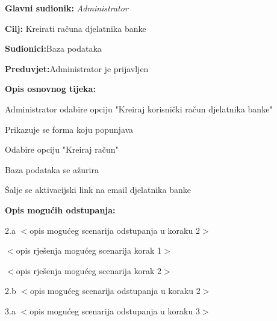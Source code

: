 \documentclass[11pt]{book}
\begin{document}
\noindent {}
\begin{packed_item}
	
	\item \textbf{Glavni sudionik: }\textit{Administrator}
	\item  \textbf{Cilj:} {Kreirati računa djelatnika banke}
	\item  \textbf{Sudionici:}{Baza podataka}
	\item  \textbf{Preduvjet:}{Administrator je prijavljen}
	\item  \textbf{Opis osnovnog tijeka:}
	
	\item[] \begin{packed_enum}
		
		\item {Administrator odabire opciju "Kreiraj korisnički račun djelatnika banke"}
		\item {Prikazuje se forma koju popunjava} 
		\item {Odabire opciju "Kreiraj račun"}
		\item {Baza podataka se ažurira}
		\item {Šalje se aktivacijski link na email djelatnika banke}
	\end{packed_enum}
	
	\item  \textbf{Opis mogućih odstupanja:}
	
	\item[] \begin{packed_item}
		
		\item[2.a] $<$opis mogućeg scenarija odstupanja u koraku 2$>$
		\item[] \begin{packed_enum}
			
			\item $<$opis rješenja mogućeg scenarija korak 1$>$
			\item $<$opis rješenja mogućeg scenarija korak 2$>$
			
		\end{packed_enum}
		\item[2.b] $<$opis mogućeg scenarija odstupanja u koraku 2$>$
		\item[3.a] $<$opis mogućeg scenarija odstupanja  u koraku 3$>$
		
	\end{packed_item}
\end{packed_item}
\end{document}
